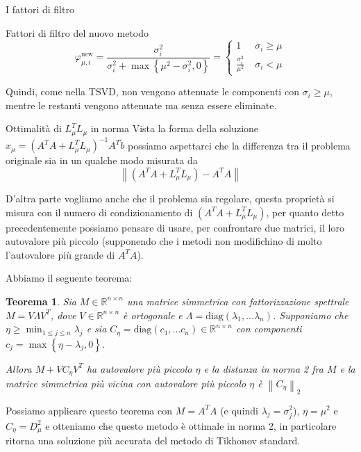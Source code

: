 \documentclass{beamer}
\newcounter{counter1}
\theoremstyle{plain}
\newtheorem{myteo}[counter1]{Teorema}
\theoremstyle{definition}
\theoremstyle{remark}
\newcommand{\set}[1]{\left\{#1\right\}}
\newcommand{\pa}[1]{\left(#1\right)}
\newcommand{\norm}[1]{\left\|#1\right\|}
\begin{document}
\begin{frame}{I fattori di filtro}
  \begin{block}{Fattori di filtro del nuovo metodo}
    \[ \varphi ^{\text{new}} _{\mu,i} = \frac{\sigma _i ^2}{\sigma _i ^2 + \max\set{
        \mu ^2 - \sigma _i ^2 ,0}  } = \left\{
      \begin{matrix}
        1\; & \sigma _i \ge \mu \\
        \frac{\sigma _i ^2}{\mu ^2} \; & \sigma _i < \mu
      \end{matrix}
    \right. \]
  \end{block}
  \vfill
  
  Quindi, come nella TSVD, non vengono attenuate le componenti con
  $\sigma _i \ge \mu$, mentre le restanti vengono attenuate ma senza
  essere eliminate.
\end{frame}

\begin{frame}{Ottimalità di $L_\mu ^T L_\mu$ in norma}
  Vista la forma della soluzione $x_\mu = \pa{ A^T A + L_\mu^T L_\mu
  }^{-1} A^T \tilde b$ possiamo aspettarci che la differenza tra il
  problema originale sia in un qualche modo misurata da 
  \[ \norm{ \pa{ A^T A + L_\mu^T L_\mu } - A^T A } \]
  
  D'altra parte vogliamo anche che il problema sia regolare, questa
  proprietà si misura con il numero di condizionamento di $\pa{ A^T A
    + L_\mu^T L_\mu }$, per quanto detto precedentemente possiamo
  pensare di usare, per confrontare due matrici, il loro autovalore
  più piccolo (supponendo che i metodi non modifichino di molto
  l'autovalore più grande di $A^T A$).
\end{frame}

\begin{frame}
  Abbiamo il seguente teorema:
  \begin{myteo}
    Sia $M \in \mathbb{R}^{n\times n}$ una matrice simmetrica con
    fattorizzazione spettrale $M = V \Lambda V^T$, dove $V \in
    \mathbb{R}^{n \times n}$ è ortogonale e  $\Lambda = \mathrm{diag} \pa{
      \lambda _1, ... \lambda _n}$. Supponiamo che  $\eta \ge \min _{1\le
      j\le n} \lambda _j$ e sia $C_\eta = \mathrm{diag}
    \pa{ c_1 , ... c_n}\in \mathbb{R}^{n\times n}$ con componenti $c_j
    = \max \set{\eta - \lambda _j, 0}$.
    
    Allora $M + V C_\eta V^T$ ha autovalore più piccolo $\eta$
    e la distanza in norma 2 fra $M$ e la matrice simmetrica più vicina
    con autovalore più piccolo $\eta$ è $\norm{ C_\eta }_2$
  \end{myteo}
  
  Possiamo applicare questo teorema con $M = A^T A$ (e quindi $\lambda
  _j = \sigma _j ^2$), $\eta = \mu ^2$ e $C_\eta = D_\mu ^2$
  e otteniamo che questo metodo è ottimale in norma 2, in particolare
  ritorna una soluzione più accurata del metodo di Tikhonov standard.
\end{frame}
\end{document}
